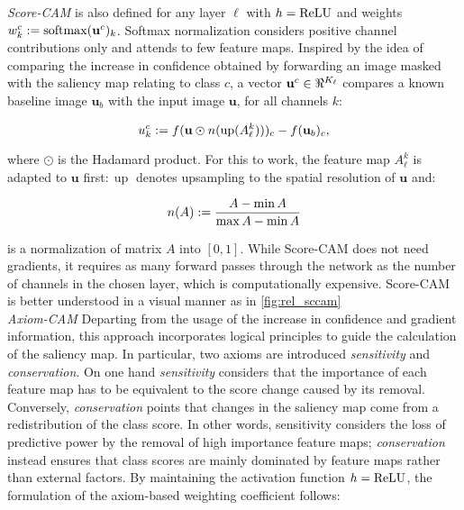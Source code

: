 \noindent\emph{Score-CAM} \autocite{wang2020score} is also defined for any layer $\ell$ with 
$h = {\operatorname{ReLU}}$ and weights $w^c_k \mathrel{:=} \operatorname{softmax}(\mathbf{u}^c)_k$.  Softmax normalization considers 
positive channel contributions only and attends to few feature maps. Inspired by the idea of 
comparing the increase in confidence obtained by forwarding an image masked with the saliency map 
relating to class $c$, a vector $\mathbf{u}^c \in \real^{K_\ell}$ compares a known baseline image 
$\mathbf{u}_b$ with the input image $\mathbf{u}$, for all channels $k$:

\begin{equation}
	u^c_k \mathrel{:=} f(\mathbf{u} \odot n(\operatorname{up}( A^k_\ell )))_c - f(\mathbf{u}_b)_c,
\label{eq:s-cam}
\end{equation}

where $\odot$ is the Hadamard product. For this to work, the feature map $A^k_\ell$ is adapted 
to $\mathbf{u}$ first$:\operatorname{up}$ denotes upsampling to the spatial resolution of 
$\mathbf{u}$ and:

\begin{equation}
	n(A) \mathrel{:=} \frac{A - \min A}{\max A - \min A}
\label{eq:norm}
\end{equation}

is a normalization of matrix $A$ into $[0,1]$. While Score-CAM does not need gradients, it requires 
as many forward passes through the network as the number of channels in the chosen layer, which is 
computationally expensive. Score-CAM is better understood in a visual manner as in 
\autoref{fig:rel_sccam}\\


\noindent \emph{Axiom-CAM} \autocite{axiombased} Departing from the usage of the increase in 
confidence and gradient information, this approach incorporates logical principles to guide the 
calculation of the saliency map. In particular, two axioms are introduced \emph{sensitivity} and 
\emph{conservation}. On one hand \emph{sensitivity} considers that the importance of each feature 
map has to be equivalent to the score change caused by its removal. Conversely, \emph{conservation} 
points that changes in the saliency map come from a redistribution of the class score. In other 
words, sensitivity considers the loss of predictive power by the removal of high importance 
feature maps; \emph{conservation} instead ensures that class scores are mainly dominated by feature 
maps rather than external factors. By maintaining the activation function $h = {\operatorname{ReLU}}$, the 
formulation of the axiom-based weighting coefficient follows:

